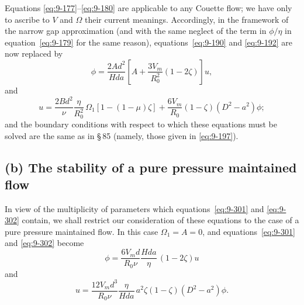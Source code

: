 Equations \eqref{eq:9-177}--\eqref{eq:9-180} are applicable to any Couette flow; we have only to ascribe to $V$ and $\Omega$ their current meanings. Accordingly, in the framework of the narrow gap approximation (and with the same neglect of the term in $\phi/\eta$ in equation~\eqref{eq:9-179} for the same reason), equations~\eqref{eq:9-190} and \eqref{eq:9-192} are now replaced by
\begin{equation}
[(D^2 - a^2)^2 + Qa^2]\phi = \frac{2Ad^2}{Hda}\left[A + \frac{3V_m}{R_0^2}(1 - 2\zeta)\right]u, \label{eq:9-301}
\end{equation}
and
\begin{equation}
[(D^2 - a^2)^2 + Qa^2]u = \frac{2Bd^2}{\nu}\frac{\eta}{R_0^2}\,\Omega_1[1 - (1-\mu)\zeta] + \frac{6V_m}{R_0}(1-\zeta)(D^2 - a^2)\phi; \label{eq:9-302}
\end{equation}
and the boundary conditions with respect to which these equations must be solved are the same as in \S\,85 (namely, those given in \eqref{eq:9-197}).

\subsection*{(b) The stability of a pure pressure maintained flow}

In view of the multiplicity of parameters which equations~\eqref{eq:9-301} and \eqref{eq:9-302} contain, we shall restrict our consideration of these equations to the case of a pure pressure maintained flow. In this case $\Omega_1 = A = 0$, and equations~\eqref{eq:9-301} and \eqref{eq:9-302} become
\begin{equation}
[(D^2 - a^2)^2 + Qa^2]\phi = \frac{6V_m d}{R_0 \nu}\frac{Hda}{\eta}\,(1 - 2\zeta)u \label{eq:9-303}
\end{equation}
and
\begin{equation}
[(D^2 - a^2)^2 + Qa^2]u = \frac{12V_m d^3}{R_0 \nu}\frac{\eta}{Hda}\, a^2\zeta(1 - \zeta)(D^2 - a^2)\phi. \label{eq:9-304}
\end{equation}

